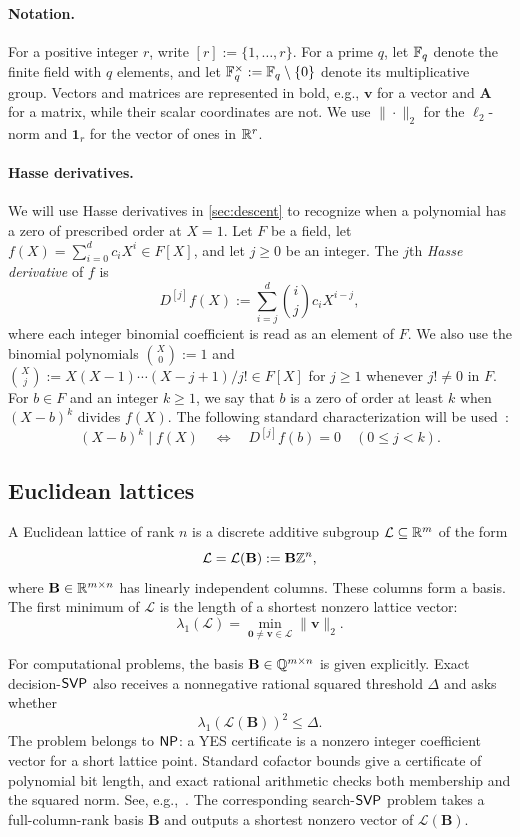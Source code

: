 \paragraph{Notation.}
For a positive integer $r$, write $[r]:=\{1,\ldots,r\}$.  For a
prime $q$, let $\mathbb F_q$ denote the finite field with $q$ elements,
and let $\mathbb F_q^\times:=\mathbb F_q\setminus\{0\}$ denote its multiplicative group.
Vectors and matrices are represented in bold, e.g., $\mathbf v$ for a vector and $\mathbf A$ for a matrix, while their scalar coordinates are not. We use $\|\cdot\|_2$ for the $\ell_2$-norm and $\mathbf1_r$ for the vector of ones in $\mathbb R^r$.

\paragraph{Hasse derivatives.}
We will use Hasse derivatives in \cref{sec:descent} to recognize when a
polynomial has a zero of prescribed order at $X=1$.  Let $F$ be a field, let
$f(X)=\sum_{i=0}^d c_iX^i\in F[X]$, and let $j\ge0$ be an integer.  The $j$th
\emph{Hasse derivative} of $f$ is
\[
 D^{[j]}f(X):=\sum_{i=j}^d\binom ij c_iX^{i-j},
\]
where each integer binomial coefficient is read as an element of $F$.
We also use the binomial polynomials $\binom{X}{0}:=1$ and
$\binom{X}{j}:=X(X-1)\cdots(X-j+1)/j!\in F[X]$ for $j\ge1$ whenever
$j!\ne0$ in $F$.
For $b\in F$ and an integer $k\ge1$, we say that $b$ is a zero of order at
least $k$ when $(X-b)^k$ divides $f(X)$.
The following standard characterization will be
used~\cite{LidlNiederreiter97}:
\begin{equation}
\label{eq:hasse-multiplicity}
 (X-b)^k\mid f(X)
 \quad\Longleftrightarrow\quad
 D^{[j]}f(b)=0\quad(0\le j<k).
\end{equation}

\subsection{Euclidean lattices}
A Euclidean lattice of rank $n$ is a discrete additive subgroup
$\mathcal L\subseteq\mathbb R^m$ of the form
\[
 \mathcal L=\mathcal L(\mathbf B):=\mathbf B\mathbb Z^n,
\]
where $\mathbf B\in\mathbb R^{m\times n}$ has linearly independent columns.  These
columns form a basis.
The first minimum of $\mathcal L$ is the length of a shortest
nonzero lattice vector:
\[
 \lambda_1(\mathcal L)
 =\min_{\mathbf0\ne\mathbf v\in\mathcal L}\|\mathbf v\|_2.
\]

For computational problems, the basis
$\mathbf B\in\mathbb Q^{m\times n}$ is given explicitly.  Exact decision-$\mathsf{SVP}$
also receives a nonnegative rational squared threshold $\Delta$ and asks
whether
\[
 \lambda_1(\mathcal L(\mathbf B))^2\le\Delta.
\]
The problem belongs to $\mathsf{NP}$: a YES certificate is a nonzero integer
coefficient vector for a short lattice point.  Standard cofactor bounds give
a certificate of polynomial bit length, and exact rational arithmetic checks
both membership and the squared norm. See, e.g.,~\cite{MicciancioGoldwasser02}.
The corresponding search-$\mathsf{SVP}$ problem takes a full-column-rank
basis $\mathbf B$ and outputs a shortest nonzero vector of
$\mathcal L(\mathbf B)$.

